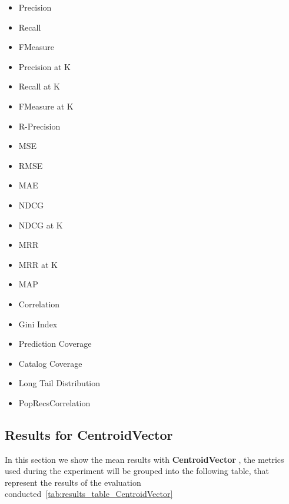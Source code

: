 \documentclass[11pt]{article}
\begin{document}
\begin{itemize}
    \item Precision

    \item Recall

    \item FMeasure

    \item Precision at K

    \item Recall at K

    \item FMeasure at K

    \item R-Precision

    \item MSE

    \item RMSE

    \item MAE

    \item NDCG

    \item NDCG at K

    \item MRR

    \item MRR at K

    \item MAP


    \item Correlation

    \item Gini Index

    \item Prediction Coverage

    \item Catalog Coverage


    \item Long Tail Distribution


    \item  PopRecsCorrelation
\end{itemize}







\subsection{Results for CentroidVector}\label{subsec:CentroidVector}
In this section we show the mean results with \textbf{ CentroidVector }, the metrics used during the experiment will be
grouped into the following table, that represent the results of the evaluation conducted~\ref{tab:results_table_CentroidVector}
\end{document}
